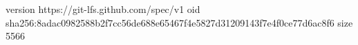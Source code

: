 version https://git-lfs.github.com/spec/v1
oid sha256:8adac0982588b2f7cc56de688e65467f4e5827d31209143f7e4f0ce77d6ac8f6
size 5566
